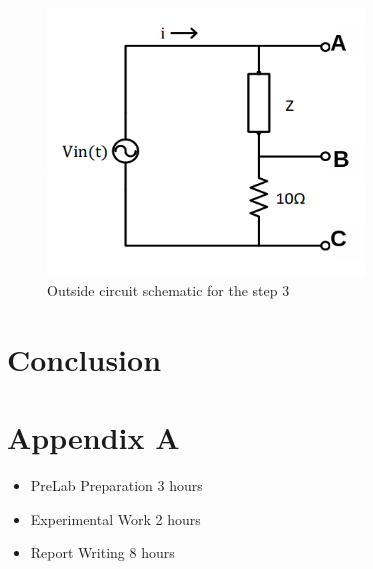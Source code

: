 \documentclass[letterpaper,12pt]{article}
\begin{document}
\begin{figure}[H]
    \centering
    \includegraphics[width = 0.75\textwidth]{3_1SCH.png}
    \caption{Outside circuit schematic for the step 3}
\end{figure} 

\section{Conclusion}


\section*{Appendix A}
\begin{itemize}
    \item PreLab Preparation 3 hours
    \item Experimental Work 2  hours
    \item Report Writing 8 hours
\end{itemize}
\end{document}
